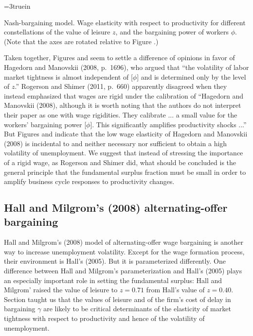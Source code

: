 \centerline{\epsfxsize=3truein}
\caption{Nash-bargaining model. Wage elasticity with respect to
productivity for different
constellations of the value of leisure $z$, and the bargaining
power of workers $\phi$. (Note that the axes are rotated relative
to Figure .)}
\endfigure


Taken together, Figures  and 
seem to settle a difference of opinions in favor of  Hagedorn and Manovskii (2008, p.~1696), who argued
that ``the volatility of labor market tightness is almost independent
of [$\phi$] and is determined only by the level of $z$.''
Rogerson and Shimer (2011, p.~660) apparently disagreed when they instead  emphasized
that wages are rigid under the calibration of ``Hagedorn and
Manovskii (2008), although it is worth noting that the authors
do not interpret their paper as one with wage rigidities. They
calibrate ... a small value for the workers' bargaining power
[$\phi$]. This significantly amplifies productivity shocks ...''
But Figures  and  indicate that  the low wage elasticity of
Hagedorn and Manovskii (2008)
is incidental to and neither necessary nor sufficient to obtain
a high volatility of unemployment. We suggest that instead of stressing the importance of a rigid wage, as Rogerson and Shimer
did, what should be concluded is the general principle that
the fundamental surplus fraction must be small in order to amplify business cycle responses to productivity changes. 


\subsection{Hall and Milgrom's (2008) alternating-offer bargaining}
 Hall and Milgrom's (2008)
model of alternating-offer wage bargaining is another way to
increase unemployment volatility. Except for
the wage formation process, their environment is  Hall's (2005). But it is  parameterized differently.
One difference between  Hall and Milgrom's parameterization and  Hall's (2005) plays  an especially  important role in setting  the
 fundamental surplus: Hall and Milgrom' raised the value of leisure  to $z=0.71$ from Hall's value of $z= 0.40$.
 Section  taught us that
the values of leisure and of  the firm's cost of delay in
bargaining $\gamma$ are likely to be critical determinants of
 the elasticity of market tightness with respect
to productivity and hence of the volatility of unemployment.


